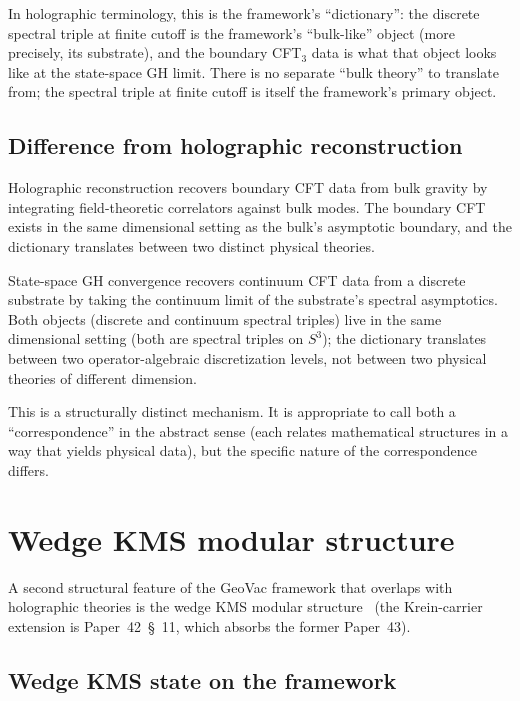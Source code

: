\documentclass[11pt,a4paper]{article}
\theoremstyle{plain}
\theoremstyle{definition}
\newcommand{\sthree}{S^{3}}
\begin{document}
In holographic terminology, this is the framework's ``dictionary'':
the discrete spectral triple at finite cutoff is the framework's
``bulk-like'' object (more precisely, its substrate), and the
boundary CFT$_{3}$ data is what that object looks like at the
state-space GH limit. There is no separate ``bulk theory'' to translate
from; the spectral triple at finite cutoff is itself the framework's
primary object.

\subsection{Difference from holographic reconstruction}

Holographic reconstruction recovers boundary CFT data from bulk
gravity by integrating field-theoretic correlators against bulk
modes. The boundary CFT exists in the same dimensional setting as the
bulk's asymptotic boundary, and the dictionary translates between two
distinct physical theories.

State-space GH convergence recovers continuum CFT data from a discrete
substrate by taking the continuum limit of the substrate's spectral
asymptotics. Both objects (discrete and continuum spectral triples)
live in the same dimensional setting (both are spectral triples on
$\sthree$); the dictionary translates between two operator-algebraic
discretization levels, not between two physical theories of different
dimension.

This is a structurally distinct mechanism. It is appropriate to call
both a ``correspondence'' in the abstract sense (each relates
mathematical structures in a way that yields physical data), but the
specific nature of the correspondence differs.

\section{Wedge KMS modular structure}
\label{sec:modular_structure}

A second structural feature of the GeoVac framework that overlaps
with holographic theories is the wedge KMS modular
structure~\cite{paper42, paper50} (the Krein-carrier extension is
Paper~42~\S~11, which absorbs the former Paper~43).

\subsection{Wedge KMS state on the framework}
\end{document}
